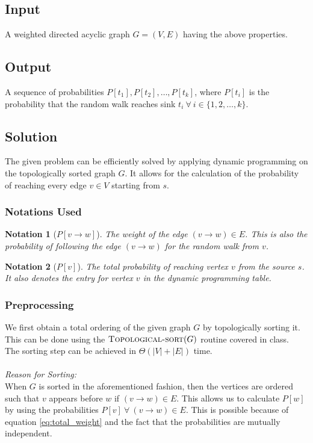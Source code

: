 \documentclass[12pt]{report}
\newtheorem{notation}{Notation}
\begin{document}
    \subsection*{Input}
    A weighted directed acyclic graph $G = (V, E)$ having the above properties.

    \subsection*{Output}
    A sequence of probabilities $P[t_{1}], P[t_{2}], \dots, P[t_{k}]$, where $P[t_{i}]$ is the probability that the random walk
    reaches sink $t_{i} \ \forall \ i \in \{ 1, 2, \dots, k \}$.

    \subsection*{Solution}
    The given problem can be efficiently solved by applying dynamic programming on the topologically sorted graph $G$.
    It allows for the calculation of the probability of reaching every edge $v \in V$ starting from $s$.

    \subsubsection*{Notations Used}
    \begin{notation}[$P{[v \to w]}$]
        The weight of the edge $(v \to w) \in E$. This is also the probability of following the edge $(v \to w)$ for the random walk from $v$.
    \end{notation}

    \begin{notation}[$P{[v]}$]
        The total probability of reaching vertex $v$ from the source $s$.
        It also denotes the entry for vertex $v$ in the dynamic programming table.
    \end{notation}

    \subsubsection*{Preprocessing}
    We first obtain a total ordering of the given graph $G$ by topologically sorting it.
    This can be done using the $\Call{Topological-sort}{G}$ routine covered in class. \\
    The sorting step can be achieved in $\Theta(|V|+|E|)$ time. \\
    \vspace*{2.5pt} \\
    \textit{Reason for Sorting:}
    \vspace*{2.5pt} \\
    When $G$ is sorted in the aforementioned fashion, then the vertices are ordered such that $v$ appears before $w$ if $(v \to w) \in E$.
    This allows us to calculate $P[w]$ by using the probabilities $P[v] \ \forall \ (v \to w) \in E$.
    This is possible because of equation \eqref{eq:total_weight} and the fact that the probabilities are mutually independent.
\end{document}
